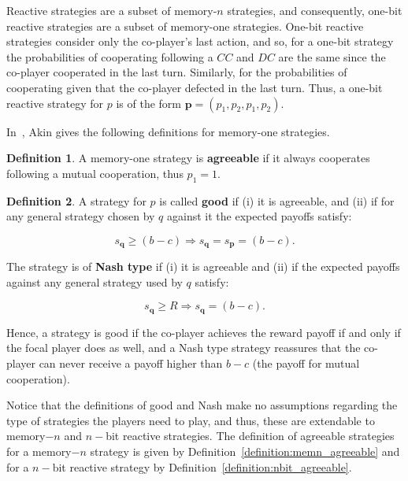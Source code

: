 \documentclass{article}
\theoremstyle{definition}
\newtheorem{definition}{Definition}[section]
\begin{document}
Reactive strategies are a subset of memory-\(n\)
strategies, and consequently, one-bit reactive strategies are a subset of
memory-one strategies. One-bit reactive strategies consider only the co-player's
last action, and so, for a one-bit strategy the probabilities of cooperating
following a \(CC\) and \(DC\) are the same since the co-player cooperated in the
last turn. Similarly, for the probabilities of cooperating given that the
co-player defected in the last turn. Thus, a one-bit reactive strategy for \(p\)
is of the form \(\mathbf{p} = (p_1, p_2, p_1, p_2)\).

In~\citep{akin:EGADS:2016}, Akin gives the following definitions for memory-one
strategies.

\begin{definition}
A memory-one strategy is \textbf{agreeable} if it always cooperates following a mutual cooperation,
thus \(p_1=1\).
\end{definition}

\begin{definition}
  A strategy for \(p\) is called \textbf{good} if (i) it is agreeable,
  and (ii) if for any general strategy chosen by \(q\) against it the expected
  payoffs satisfy:
  
  \begin{equation}
    s_{\mathbf{q}} \geq (b - c) \Rightarrow s_{\mathbf{q}} = s_{\mathbf{p}} =  (b - c).
  \end{equation}

  The strategy is of \textbf{Nash type} if (i) it is agreeable and (ii) if the
  expected payoffs against any general strategy used by \(q\) satisfy:

  \begin{equation}
    s_{\mathbf{q}} \geq R \Rightarrow s_{\mathbf{q}} =  (b - c).
  \end{equation}
\end{definition}

Hence, a strategy is good if the co-player achieves the reward payoff if and
only if the focal player does as well, and a Nash type strategy reassures that the
co-player can never receive a payoff higher than \(b - c\) (the payoff for mutual
cooperation).

Notice that the definitions of good and Nash make no assumptions regarding the
type of strategies the players need to play, and thus, these are extendable to
memory\(-n\) and \(n-\)bit reactive strategies. The definition of agreeable
strategies for a memory\(-n\)  strategy is given by
Definition~\ref{definition:memn_agreeable} and for a \(n-\)bit reactive
strategy by Definition~\ref{definition:nbit_agreeable}.
\end{document}
